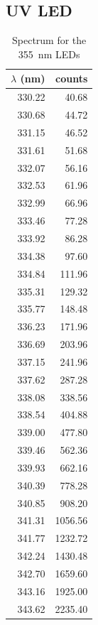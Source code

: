 \subsection*{UV LED}
\begin{table}[!h]
\centering
\caption{Spectrum for the 355~nm LEDs}
\label{tab:led_uv}
\begin{tabular}{rr}
\toprule
 $\lambda$ (nm) &    counts \\
\midrule
          330.22 &     40.68 \\
          330.68 &     44.72 \\
          331.15 &     46.52 \\
          331.61 &     51.68 \\
          332.07 &     56.16 \\
          332.53 &     61.96 \\
          332.99 &     66.96 \\
          333.46 &     77.28 \\
          333.92 &     86.28 \\
          334.38 &     97.60 \\
          334.84 &    111.96 \\
          335.31 &    129.32 \\
          335.77 &    148.48 \\
          336.23 &    171.96 \\
          336.69 &    203.96 \\
          337.15 &    241.96 \\
          337.62 &    287.28 \\
          338.08 &    338.56 \\
          338.54 &    404.88 \\
          339.00 &    477.80 \\
          339.46 &    562.36 \\
          339.93 &    662.16 \\
          340.39 &    778.28 \\
          340.85 &    908.20 \\
          341.31 &   1056.56 \\
          341.77 &   1232.72 \\
          342.24 &   1430.48 \\
          342.70 &   1659.60 \\
          343.16 &   1925.00 \\
          343.62 &   2235.40 \\

\end{tabular}
\end{table}
